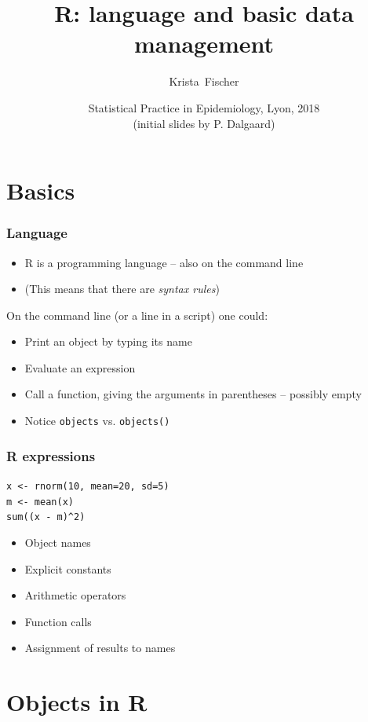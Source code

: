 \documentclass[xcolor=svgnames,handout]{beamer}
\title{R: language and basic data management}
\author{Krista~Fischer}
\date[Lyon 2018] %
{Statistical Practice in Epidemiology, Lyon, 2018 \\ (initial slides by P. Dalgaard)}
\newcommand{\code}[1]{\texttt{#1}}
\begin{document}
\begin{frame}
  \titlepage
\end{frame}

\section{Basics}

\begin{frame}
  \frametitle{Language}
  \begin{itemize}
  \item R is a programming language -- also on the command line
  \item (This means that there are \emph{syntax rules})
  \end{itemize}
On the command line (or a line in a script) one could:
  \begin{itemize}
  \item Print an object by typing its name
  \item Evaluate an expression 
  \item Call a function, giving the arguments in parentheses -- possibly empty
  \item Notice \code{objects} vs. \code{objects()}
  \end{itemize}
\end{frame}


\begin{frame}
  \frametitle{R expressions}
\texttt{\alert<6>{\alert<2>{x} <-} \alert<5>{rnorm(\alert<3>{10}, mean=\alert<3>{20}, 
 sd=\alert<3>{5})}\\
\alert<6>{\alert<2>{m} <-} \alert<5>{mean(\alert<2>{x})}\\
\alert<5>{sum((\alert<2>{x} \alert<4>{-} \alert<2>{m})\alert<4>{\textasciicircum}\alert<3>{2})}
}\\
\pause
  \begin{itemize}
  \item Object \alert<2>{names}
  \item Explicit \alert<3>{constants}
  \item Arithmetic \alert<4>{operators}
  \item \alert<5>{Function calls}
  \item \alert<6>{Assignment} of results to names
  \end{itemize}
\end{frame}

\section{Objects in R}
\end{document}
